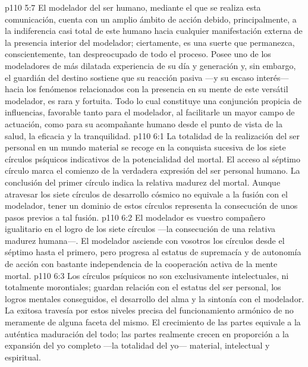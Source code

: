 \vs p110 5:7 \pc El modelador del ser humano, mediante el que se realiza esta comunicación, cuenta con un amplio ámbito de acción debido, principalmente, a la indiferencia casi total de este humano hacia cualquier manifestación externa de la presencia interior del modelador; ciertamente, es una suerte que permanezca, conscientemente, tan despreocupado de todo el proceso. Posee uno de los modeladores de más dilatada experiencia de su día y generación y, sin embargo, el guardián del destino sostiene que su reacción pasiva ---y su escaso interés--- hacia los fenómenos relacionados con la presencia en su mente de este versátil modelador, es rara y fortuita. Todo lo cual constituye una conjunción propicia de influencias, favorable tanto para el modelador, al facilitarle un mayor campo de actuación, como para su acompañante humano desde el punto de vista de la salud, la eficacia y la tranquilidad.
\vs p110 6:1 La totalidad de la realización del ser personal en un mundo material se recoge en la conquista sucesiva de los siete círculos psíquicos indicativos de la potencialidad del mortal. El acceso al séptimo círculo marca el comienzo de la verdadera expresión del ser personal humano. La conclusión del primer círculo indica la relativa madurez del mortal. Aunque atravesar los siete círculos de desarrollo cósmico no equivale a la fusión con el modelador, tener un dominio de estos círculos representa la consecución de unos pasos previos a tal fusión.
\vs p110 6:2 El modelador es vuestro compañero igualitario en el logro de los siete círculos ---la consecución de una relativa madurez humana---. El modelador asciende con vosotros los círculos desde el séptimo hasta el primero, pero progresa al estatus de supremacía y de autonomía de acción con bastante independencia de la cooperación activa de la mente mortal.
\vs p110 6:3 \pc Los círculos psíquicos no son exclusivamente intelectuales, ni totalmente morontiales; guardan relación con el estatus del ser personal, los logros mentales conseguidos, el desarrollo del alma y la sintonía con el modelador. La exitosa travesía por estos niveles precisa del funcionamiento armónico de  no meramente de alguna faceta del mismo. El crecimiento de las partes equivale a la auténtica maduración del todo; las partes realmente crecen en proporción a la expansión del yo completo ---la totalidad del yo--- material, intelectual y espiritual.

